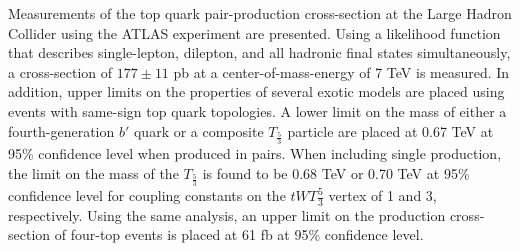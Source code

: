 %

Measurements of the top quark pair-production cross-section at the Large Hadron Collider using the ATLAS experiment are presented.
Using a likelihood function that describes single-lepton, dilepton, and all hadronic final states simultaneously, a cross-section of $177 \pm 11$ pb at a center-of-mass-energy of 7 TeV is measured.
In addition, upper limits on the properties of several exotic models are placed using events with same-sign top quark topologies.
A lower limit on the mass of either a fourth-generation $b'$ quark or a composite $T_{\frac{5}{3}}$ particle are placed at 0.67 TeV at 95\% confidence level when produced in pairs.
When including single production, the limit on the mass of the $T_{\frac{5}{3}}$ is found to be 0.68 TeV or 0.70 TeV at 95\% confidence level for coupling constants on the $tWT\frac{5}{3}$ vertex of 1 and 3, respectively.
Using the same analysis, an upper limit on the production cross-section of four-top events is placed at 61 fb at 95\% confidence level.



